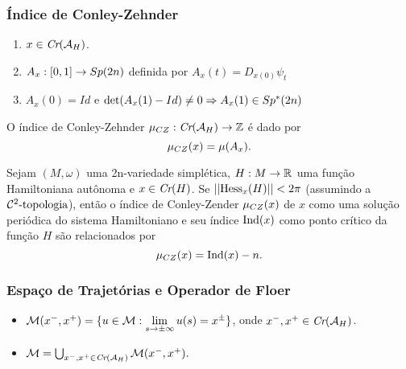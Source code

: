 \documentclass{beamer}
\begin{document}
\begin{footnotesize}
\begin{frame}
	\end{frame}

	
	\begin{frame}
		
		\frametitle{Índice de Conley-Zehnder}
		\begin{enumerate}
			\item $x\in \textit{Cr}(\mathcal{A}_{H})$.
			
			\item $A_{x}:[0,1] \to Sp(2n)$ definida por $A_{x}(t) = D_{x(0)}\psi_{t}$
			
			\item $A_{x}(0) =Id$ e $\det(A_{x}(1)-Id) \neq 0 \Rightarrow A_{x}(1)\in Sp^{*}(2n)$ 
		\end{enumerate}
		
		O índice de Conley-Zehnder $\mu_{CZ}:\textit{Cr}(\mathcal{A}_{H}) \to \mathbb{Z}$ é dado por 
		$$
		\mu_{CZ}(x) = \mu(A_{x}).
		$$
		
		
		\begin{corolario}
			Sejam $(M,\omega)$ uma 2n-variedade simplética, $H:M\to \mathbb{R}^{}$ uma função Hamiltoniana autônoma e $x \in \textit{Cr}(H)$. Se $||\text{Hess}_{x}(H)||<2\pi$ (assumindo a $\mathcal{C}^{2}\text{-topologia}$), então o índice de Conley-Zender $\mu_{CZ}(x)$ de $x$ como uma solução periódica do sistema Hamiltoniano e seu índice $\text{Ind}(x)$ como ponto crítico da função $H$ são relacionados por
			$$
			\mu_{CZ}(x) = \text{Ind}(x)-n.
			$$
		\end{corolario}
	\end{frame}
		\begin{frame}\frametitle{Espaço de Trajetórias e Operador de Floer}
			
		 \begin{itemize} 	
		 	
		 	
		 	\item   $\mathcal{M}(x^{-}, x^{+}) =\{u \in \mathcal{M}: \lim\limits_{s\to \pm \infty}u(s) = x^{\pm}\}$, onde  $x^{-}, x^{+}\in \textit{Cr}(\mathcal{A}_{H})$. 
		 	
		 	\item $ \mathcal{M} = \bigcup_{x^{-}, x^{+} \in \textit{Cr}(\mathcal{A}_{H})} \mathcal{M}(x^{-}, x^{+}).$ 	
		 	

\end{itemize}
\end{frame}
\end{footnotesize}
\end{document}
